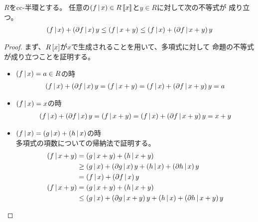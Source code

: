 {	\begin{proposition}[Taylorの定理]\label{prop:Taylorの定理} %
		$R$をcc-半環とする。
		任意の$\mathinner{({f{\,|\,}x})}\in R\mathinner{[\![{x}]\!]}$と$y\in R$に対して次の不等式が
		成り立つ。
		\begin{equation*}\begin{split}
			\mathinner{({f{\,|\,}x})} + \mathinner{({\partial f{\,|\,}x})}y \le \mathinner{({f{\,|\,}x + y})}
			\le \mathinner{({f{\,|\,}x})} + \mathinner{({\partial f{\,|\,}x + y})}y
		\end{split}\end{equation*}
	\end{proposition} %
	\begin{proof} %
		まず、$R\mathinner{[{x}]}$が$x$で生成されることを用いて、多項式に対して
		命題の不等式が成り立つことを証明する。
		\begin{itemize}\setlength{\itemsep}{-1mm} %
			\item $\mathinner{({f{\,|\,}x})}=a\in R$の時
			\begin{equation*}\begin{split}
				\mathinner{({f{\,|\,}x})} + \mathinner{({\partial f{\,|\,}x})}y = \mathinner{({f{\,|\,}x + y})}
				= \mathinner{({f{\,|\,}x})} + \mathinner{({\partial f{\,|\,}x + y})}y = a
			\end{split}\end{equation*}
			\item $\mathinner{({f{\,|\,}x})}=x$の時
			\begin{equation*}\begin{split}
				\mathinner{({f{\,|\,}x})} + \mathinner{({\partial f{\,|\,}x})}y = \mathinner{({f{\,|\,}x + y})}
				= \mathinner{({f{\,|\,}x})} + \mathinner{({\partial f{\,|\,}x + y})}y = x + y
			\end{split}\end{equation*}
			\item $\mathinner{({f{\,|\,}x})}=\mathinner{({g{\,|\,}x})} + \mathinner{({h{\,|\,}x})}$の時 \\
			多項式の項数についての帰納法で証明する。
			\begin{equation*}\begin{split}
				\plr{f\bou x + y} &= \plr{g\bou x + y} + \plr{h\bou x + y} \\
				&\ge \plr{g\bou x} + \plr{\partial g\bou x}y
					+ \plr{h\bou x} + \plr{\partial h\bou x}y \\
				&= \plr{f\bou x} + \plr{\partial f\bou x}y \\
				\plr{f\bou x + y} &= \plr{g\bou x + y} + \plr{h\bou x + y} \\
				&\le \plr{g\bou x} + \plr{\partial g\bou x + y}y
					+ \plr{h\bou x} + \plr{\partial h\bou x + y}y \\

\end{split}
\end{equation*}
\end{itemize}
\end{proof}}
